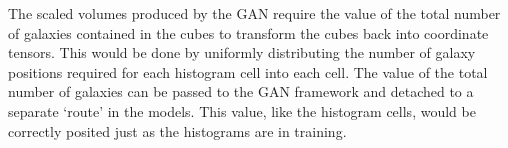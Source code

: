 \documentclass[twocolumn]{article}
\numberwithin{equation}{section}
\begin{document}
The scaled volumes produced by the GAN require the value of the total number of galaxies contained in the cubes to 
transform the cubes back into coordinate tensors. This would be done by uniformly distributing the number of galaxy 
positions required for each histogram cell into each cell. The value of the total number of galaxies can be passed to 
the GAN framework and detached to a separate `route' in the models. This value, like the histogram cells, would be 
correctly posited just as the histograms are in training. 




\end{document}
